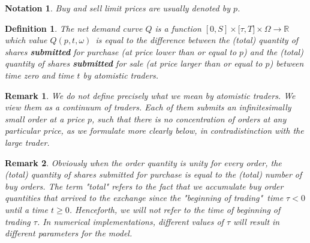 \documentclass{article}
\newtheorem{definition}{Definition}
\newtheorem{remark}{Remark}
\newtheorem{notation}{Notation}
\begin{document}


\begin{notation}
Buy and sell limit prices are usually denoted by $p$.
\end{notation}



\begin{definition}
The net demand curve $Q$ is a function $[0,S]\times \mathbb{[\tau },T]\times
\Omega \mathbb{\rightarrow R}$ which value $Q(p,t,\omega )$\ is equal to the
difference between the (total) quantity of shares \textbf{submitted} for
purchase (at price lower than or equal to $p$) and the (total) quantity of
shares \textbf{submitted} for sale (at price larger than or equal to $p$)
between time zero and time $t$ by atomistic traders.
\end{definition}



\begin{remark}
We do not define precisely what we mean by atomistic traders. We view them
as a continuum of traders. Each of them submits an infinitesimally small
order at a price $p$, such that there is no concentration of orders at any
particular price, as we formulate more clearly below, in contradistinction
with the large trader.
\end{remark}



\begin{remark}
Obviously when the order quantity is unity for every order, the (total)
quantity of shares submitted for purchase is equal to the (total) number of
buy orders. The term "total" refers to the fact that we accumulate buy order
quantities that arrived to the exchange since the "beginning of trading"\
time $\tau <0$ until a time $t\geq 0$. Henceforth, we will not refer to the
time of beginning of trading $\tau $. In numerical implementations,
different values of $\tau $ will result in different parameters for the
model.
\end{remark}


\end{document}
